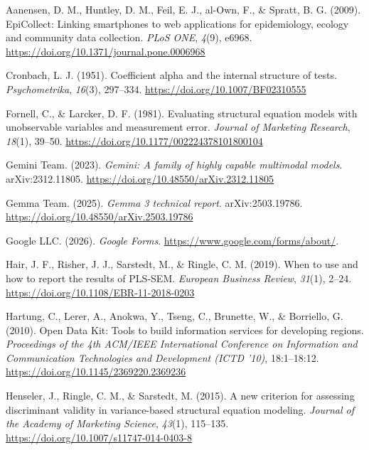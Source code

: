 \documentclass[10pt,a4paper,onecolumn]{article}
\newlength{\cslhangindent}
\newenvironment{CSLReferences}[2] %
 {\begin{list}{}{%
  \setlength{\itemindent}{0pt}
  \setlength{\leftmargin}{0pt}
  \setlength{\parsep}{0pt}
  \ifodd #1
   \setlength{\leftmargin}{\cslhangindent}
   \setlength{\itemindent}{-1\cslhangindent}
  \fi
  \setlength{\itemsep}{#2\baselineskip}}}
 {\end{list}}
\begin{document}
\protect{}\label{refs}
\begin{CSLReferences}{1}{0}
{Aanensen, D. M., Huntley, D. M., Feil, E. J., al-Own, F., \& Spratt, B.
G.} (2009). {EpiCollect}: Linking smartphones to web applications for
epidemiology, ecology and community data collection. \emph{PLoS ONE},
\emph{4}(9), e6968. \url{https://doi.org/10.1371/journal.pone.0006968}

Cronbach, L. J. (1951). Coefficient alpha and the internal structure of
tests. \emph{Psychometrika}, \emph{16}(3), 297--334.
\url{https://doi.org/10.1007/BF02310555}

Fornell, C., \& Larcker, D. F. (1981). Evaluating structural equation
models with unobservable variables and measurement error. \emph{Journal
of Marketing Research}, \emph{18}(1), 39--50.
\url{https://doi.org/10.1177/002224378101800104}

Gemini Team. (2023). \emph{Gemini: A family of highly capable multimodal
models}. arXiv:2312.11805.
\url{https://doi.org/10.48550/arXiv.2312.11805}

Gemma Team. (2025). \emph{Gemma 3 technical report}. arXiv:2503.19786.
\url{https://doi.org/10.48550/arXiv.2503.19786}

Google LLC. (2026). \emph{Google {Forms}}.
\url{https://www.google.com/forms/about/}.

Hair, J. F., Risher, J. J., Sarstedt, M., \& Ringle, C. M. (2019). When
to use and how to report the results of {PLS-SEM}. \emph{European
Business Review}, \emph{31}(1), 2--24.
\url{https://doi.org/10.1108/EBR-11-2018-0203}

Hartung, C., Lerer, A., Anokwa, Y., Tseng, C., Brunette, W., \&
Borriello, G. (2010). Open {Data} {Kit}: Tools to build information
services for developing regions. \emph{Proceedings of the 4th ACM/IEEE
International Conference on Information and Communication Technologies
and Development (ICTD '10)}, 18:1--18:12.
\url{https://doi.org/10.1145/2369220.2369236}

Henseler, J., Ringle, C. M., \& Sarstedt, M. (2015). A new criterion for
assessing discriminant validity in variance-based structural equation
modeling. \emph{Journal of the Academy of Marketing Science},
\emph{43}(1), 115--135. \url{https://doi.org/10.1007/s11747-014-0403-8}


\end{CSLReferences}
\end{document}
